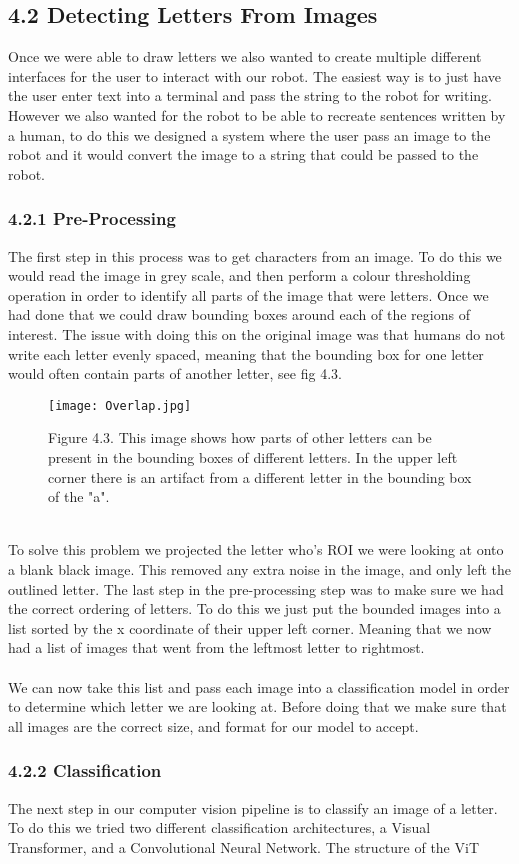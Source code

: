 \documentclass[letterpaper]{article}
\begin{document}
\subsection{4.2 Detecting Letters From Images}
Once we were able to draw letters we also wanted to create multiple different interfaces for the user to interact with our robot. The easiest way is to just have the user enter text into a terminal and pass the string to the robot for writing. However we also wanted for the robot to be able to recreate sentences written by a human, to do this we designed a system where the user pass an image to the robot and it would convert the image to a string that could be passed to the robot.
\subsubsection{4.2.1 Pre-Processing}
The first step in this process was to get characters from an image. To do this we would read the image in grey scale, and then perform a colour thresholding operation in order to identify all parts of the image that were letters. Once we had done that we could draw bounding boxes around each of the regions of interest. The issue with doing this on the original image was that humans do not write each letter evenly spaced, meaning that the bounding box for one letter would often contain parts of another letter, see fig 4.3. \\
\begin{figure}[http]
    \centering
    \texttt{[image: Overlap.jpg]}
    \caption*{Figure 4.3. This image shows how parts of other letters can be present in the bounding boxes of different letters. In the upper left corner there is an artifact from a different letter in the bounding box of the "a".}
    \label{fig 4.3}
\end{figure}\\
To solve this problem we projected the letter who's ROI we were looking at onto a blank black image. This removed any extra noise in the image, and only left the outlined letter. The last step in the pre-processing step was to make sure we had the correct ordering of letters. To do this we just put the bounded images into a list sorted by the x coordinate of their upper left corner. Meaning that we now had a list of images that went from the leftmost letter to rightmost. \\\\
%
We can now take this list and pass each image into a classification model in order to determine which letter we are looking at. Before doing that we make sure that all images are the correct size, and format for our model to accept.
\subsubsection{4.2.2 Classification}
The next step in our computer vision pipeline is to classify an image of a letter. To do this we tried two different classification architectures, a Visual Transformer, and a Convolutional Neural Network. The structure of the ViT 
\end{document}
